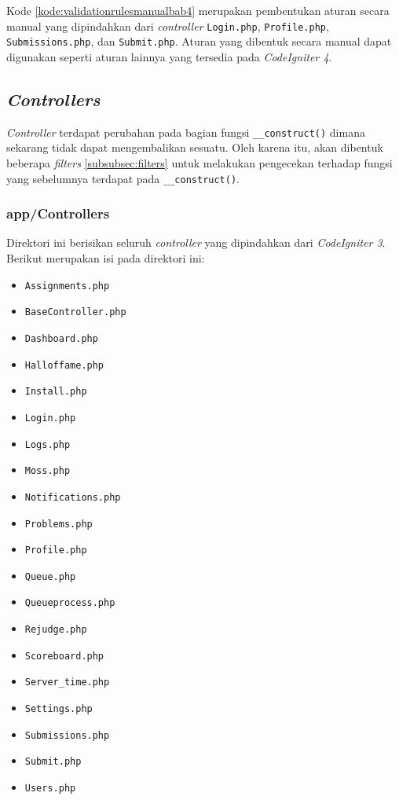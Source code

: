 Kode \ref{kode:validationrulesmanualbab4} merupakan pembentukan aturan secara manual yang dipindahkan dari \textit{controller} \texttt{Login.php}, \texttt{Profile.php}, \texttt{Submissions.php}, dan \texttt{Submit.php}. Aturan yang dibentuk secara manual dapat digunakan seperti aturan lainnya yang tersedia pada \textit{CodeIgniter 4}.

\subsection{\textit{Controllers}}
\textit{Controller} terdapat perubahan pada bagian fungsi \texttt{\_\_construct()} dimana sekarang tidak dapat mengembalikan sesuatu. Oleh karena itu, akan dibentuk beberapa \textit{filters} \ref{subsubsec:filters} untuk melakukan pengecekan terhadap fungsi yang sebelumnya terdapat pada \texttt{\_\_construct()}.
	\subsubsection{app/Controllers} 
	Direktori ini berisikan seluruh \textit{controller} yang dipindahkan dari \textit{CodeIgniter 3}. Berikut merupakan isi pada direktori ini:
	\begin{itemize}
		\item \texttt{Assignments.php}
		\item \texttt{BaseController.php}
		\item \texttt{Dashboard.php}
		\item \texttt{Halloffame.php}
		\item \texttt{Install.php}
		\item \texttt{Login.php}
		\item \texttt{Logs.php}
		\item \texttt{Moss.php}
		\item \texttt{Notifications.php}
		\item \texttt{Problems.php}
		\item \texttt{Profile.php}
		\item \texttt{Queue.php}
		\item \texttt{Queueprocess.php}
		\item \texttt{Rejudge.php}
		\item \texttt{Scoreboard.php}
		\item \texttt{Server\_time.php}
		\item \texttt{Settings.php}
		\item \texttt{Submissions.php}
		\item \texttt{Submit.php}
		\item \texttt{Users.php}
	\end{itemize}

